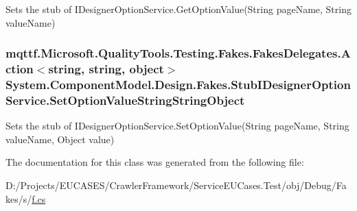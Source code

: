 Sets the stub of I\-Designer\-Option\-Service.\-Get\-Option\-Value(\-String page\-Name, String value\-Name)

\hypertarget{class_system_1_1_component_model_1_1_design_1_1_fakes_1_1_stub_i_designer_option_service_ad9fb282f258e1e0559a2fdb245c1b873}{
\subsubsection[{Set\-Option\-Value\-String\-String\-Object}]{\setlength{\rightskip}{0pt plus 5cm}mqttf.\-Microsoft.\-Quality\-Tools.\-Testing.\-Fakes.\-Fakes\-Delegates.\-Action$<$string, string, object$>$ System.\-Component\-Model.\-Design.\-Fakes.\-Stub\-I\-Designer\-Option\-Service.\-Set\-Option\-Value\-String\-String\-Object}}\label{class_system_1_1_component_model_1_1_design_1_1_fakes_1_1_stub_i_designer_option_service_ad9fb282f258e1e0559a2fdb245c1b873}


Sets the stub of I\-Designer\-Option\-Service.\-Set\-Option\-Value(\-String page\-Name, String value\-Name, Object value)



The documentation for this class was generated from the following file\-:\begin{DoxyCompactItemize}
\item 
D\-:/\-Projects/\-E\-U\-C\-A\-S\-E\-S/\-Crawler\-Framework/\-Service\-E\-U\-Cases.\-Test/obj/\-Debug/\-Fakes/s/\hyperlink{s_2f_8cs}{f.\-cs}\end{DoxyCompactItemize}

